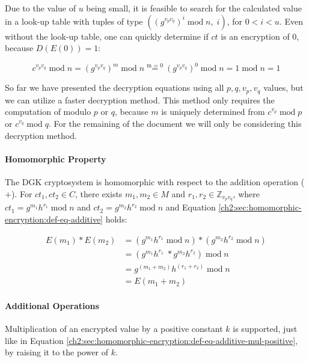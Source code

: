 \begin{definition}
    Due to the value of $u$ being small, it is feasible to search for the calculated value in a look-up table with tuples of type $((g^{v_pv_q})^i \; \textrm{mod} \; n, \; i)$, for $0 < i < u$. Even without the look-up table, one can quickly determine if $ct$ is an encryption of 0, because $D(E(0)) = 1$:

    \begin{equation}\label{chapter3:definition:dgk:equation:zero-dec}
        c^{v_pv_q} \; \textrm{mod} \; n = (g^{v_pv_q})^m \; \textrm{mod} \; n \stackrel{\text{m = 0}}{=} (g^{v_pv_q})^0 \; \textrm{mod} \; n = 1 \; \textrm{mod} \; n = 1
    \end{equation}

    So far we have presented the decryption equations using all $p, q, v_p, v_q$ values, but we can utilize a faster decryption method. This method only requires the computation of modulo $p$ or $q$, because $m$ is uniquely determined from $c^{v_p} \; \textrm{mod} \; p$ or $c^{v_q} \; \textrm{mod} \; q$. For the remaining of the document we will only be considering this decryption method.

    \paragraph{Homomorphic Property} The \gls{DGK} cryptosystem is homomorphic with respect to the addition operation ($+$). For $ct_1, ct_2 \in C$, there exists $m_1, m_2 \in M$ and $r_1, r_2 \in \mathbb{Z}_{v_pv_q}$, where $ct_1 = g^{m_1}h^{r_1}  \; \textrm{mod} \; n$ and $ct_2 = g^{m_2}h^{r_2}  \; \textrm{mod} \; n$ and Equation \ref{ch2:sec:homomorphic-encryption:def-eq-additive} holds:

    \begin{equation}
        \begin{split}
            E(m_1) * E(m_2) &= (g^{m_1}h^{r_1} \; \textrm{mod} \; n) * (g^{m_2}h^{r_2} \; \textrm{mod} \; n) \\
            &= ( g^{m_1}h^{r_1}  \; * g^{m_2}h^{r_2} ) \; \textrm{mod} \; n \\
            &= g^{(m_1 + m_2)}h^{(r_1 + r_2)} \; \textrm{mod} \; n \\
            &= E(m_1 + m_2)
        \end{split}
    \end{equation}

    \paragraph{Additional Operations} Multiplication of an encrypted value by a positive constant $k$ is supported, just like in Equation \ref{ch2:sec:homomorphic-encryption:def-eq-additive-mul-positive}, by raising it to the power of $k$.


\end{definition}
